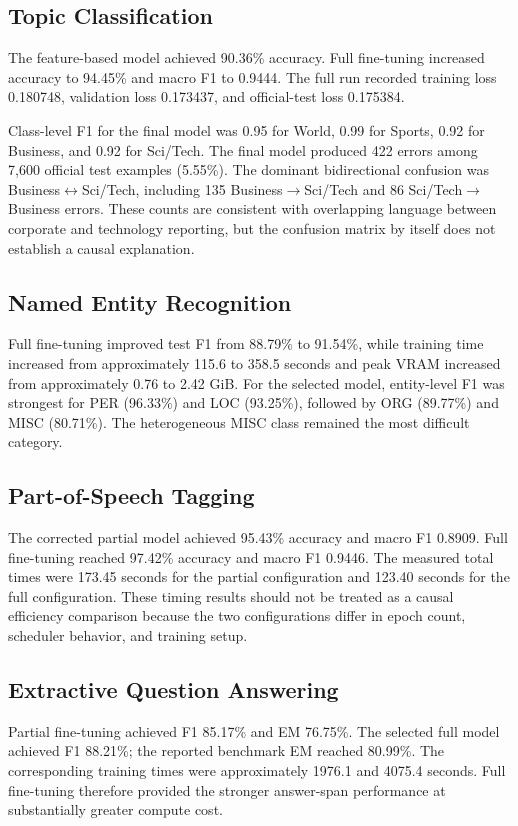 \documentclass[conference]{IEEEtran}
\begin{document}
\subsection{Topic Classification}
The feature-based model achieved 90.36\% accuracy. Full fine-tuning increased accuracy to 94.45\% and macro F1 to 0.9444. The full run recorded training loss 0.180748, validation loss 0.173437, and official-test loss 0.175384.

Class-level F1 for the final model was 0.95 for World, 0.99 for Sports, 0.92 for Business, and 0.92 for Sci/Tech. The final model produced 422 errors among 7,600 official test examples (5.55\%). The dominant bidirectional confusion was Business$\leftrightarrow$Sci/Tech, including 135 Business$\rightarrow$Sci/Tech and 86 Sci/Tech$\rightarrow$Business errors. These counts are consistent with overlapping language between corporate and technology reporting, but the confusion matrix by itself does not establish a causal explanation.

\subsection{Named Entity Recognition}
Full fine-tuning improved test F1 from 88.79\% to 91.54\%, while training time increased from approximately 115.6 to 358.5 seconds and peak VRAM increased from approximately 0.76 to 2.42 GiB. For the selected model, entity-level F1 was strongest for PER (96.33\%) and LOC (93.25\%), followed by ORG (89.77\%) and MISC (80.71\%). The heterogeneous MISC class remained the most difficult category.

\subsection{Part-of-Speech Tagging}
The corrected partial model achieved 95.43\% accuracy and macro F1 0.8909. Full fine-tuning reached 97.42\% accuracy and macro F1 0.9446. The measured total times were 173.45 seconds for the partial configuration and 123.40 seconds for the full configuration. These timing results should not be treated as a causal efficiency comparison because the two configurations differ in epoch count, scheduler behavior, and training setup.

\subsection{Extractive Question Answering}
Partial fine-tuning achieved F1 85.17\% and EM 76.75\%. The selected full model achieved F1 88.21\%; the reported benchmark EM reached 80.99\%. The corresponding training times were approximately 1976.1 and 4075.4 seconds. Full fine-tuning therefore provided the stronger answer-span performance at substantially greater compute cost.
\end{document}
